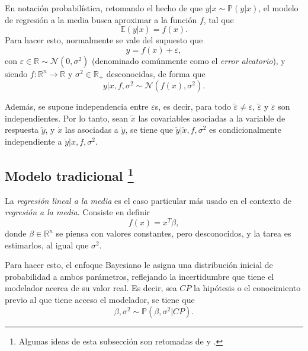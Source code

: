 En notaci\'on probabil\'istica, retomando el hecho de que $y|x \sim \mathbb{P}(y|x)$, el modelo de regresi\'on a la media busca aproximar a la funci\'on $f$, tal que 
\begin{equation*}
    \mathbb{E}(y|x) = f(x).
\end{equation*}
Para hacer esto, normalmente se vale del supuesto que
\begin{equation*}
    y = f(x) + \varepsilon,
\end{equation*}
con $\varepsilon \in \mathbb{R} \sim \mathcal{N}(0,\sigma^2)$ (denominado com\'unmente como el \textit{error aleatorio}), y siendo $f: \mathbb{R}^n \rightarrow \mathbb{R}$ y $\sigma^2 \in \mathbb{R_+}$ desconocidas, de forma que
\begin{equation*}
    y | x, f, \sigma^2 \sim \mathcal{N}(f(x),\sigma^2).
\end{equation*}

Adem\'as, se supone independencia entre $\varepsilon$s, es decir, para todo $\tilde{\varepsilon} \neq \dot{\varepsilon}$, $\tilde{\varepsilon}$ y $\dot{\varepsilon}$ son independientes. Por lo tanto, sean $\tilde{x}$ las covariables asociadas a la variable de respuesta $\tilde{y}$, y $\dot{x}$ las asociadas a $\dot{y}$, se tiene que $\tilde{y} | \tilde{x}, f, \sigma^2$ es condicionalmente independiente a $\dot{y} | \dot{x}, f, \sigma^2$.

\subsection[Modelo tradicional]{
    Modelo tradicional
    \footnote{Algunas ideas de esta subsecci\'on son retomadas de \cite{Denison_BayesMethods} y \cite{Bannerjee_BayLinMod}.}
}

La \textit{regresi\'on lineal a la media} es el caso particular m\'as usado en el contexto de \textit{regresi\'on a la media}. Consiste en definir
\begin{equation*}
    f(x) = x^T\beta,
\end{equation*}
donde $\beta \in \mathbb{R}^n$ se piensa con valores constantes, pero desconocidos, y la tarea es estimarlos, al igual que $\sigma^2$.

Para hacer esto, el enfoque Bayesiano le asigna una distribución inicial de probabilidad a ambos par\'ametros, reflejando la incertidumbre que tiene el modelador acerca de su valor real. Es decir, sea $CP$ la hip\'otesis o el conocimiento previo al que tiene acceso el modelador, se tiene que 
\begin{equation*}
    \beta,\sigma^2 \sim \mathbb{P}(\beta,\sigma^2|CP).
\end{equation*}

